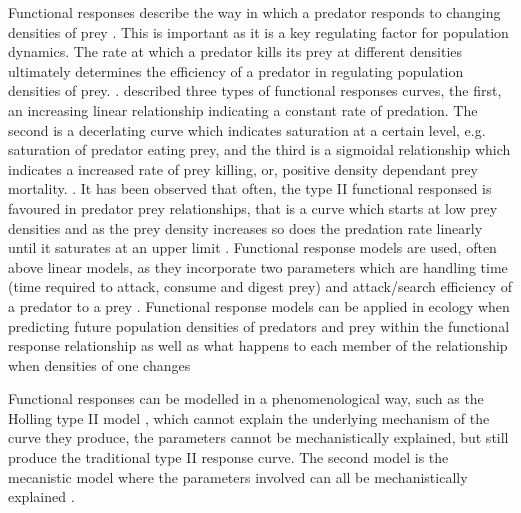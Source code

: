 \documentclass[11pt]{article}
\begin{document}
	
Functional responses describe the way in which a predator responds to changing densities of prey \cite{Holling1959}. This is important as it is a key regulating factor for population dynamics. The rate at which a predator kills its prey at different densities ultimately determines the efficiency of a predator in regulating population densities of prey. \cite{Murdoch1975}. \cite{Holling1959} described three types of functional responses curves, the first, an increasing linear relationship indicating a constant rate of predation. The second is a decerlating curve which indicates saturation at a certain level, e.g. saturation of predator eating prey, and the third is a sigmoidal relationship which indicates a increased rate of prey killing, or, positive density dependant prey mortality. \cite{Pervez2005}. It has been observed that often, the type II functional responsed is favoured in predator prey relationships, that is a curve which starts at low prey densities and as the prey density increases so does the predation rate linearly until it saturates at an upper limit \cite{Jeschke2002}. Functional response models are used, often above linear models, as they incorporate two parameters which are handling time (time required to attack, consume and digest prey) and attack/search efficiency of a predator to a prey \cite{Fathipour2016}. Functional response models can be applied in ecology when predicting future population densities of predators and prey within the functional response relationship as well as what happens to each member of the relationship when densities of one changes \cite{Jeschke2002}

Functional responses can be modelled in a phenomenological way, such as the Holling type II model \cite{Holling1959}, which cannot explain the underlying mechanism of the curve they produce, the parameters cannot be mechanistically explained, but still produce the traditional type II response curve. The second model is the mecanistic model where the parameters involved can all be mechanistically explained \cite{Jeschke2002}.
\end{document}

